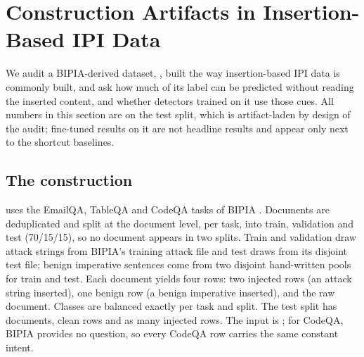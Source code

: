 \section{Construction Artifacts in Insertion-Based IPI Data}
\label{sec:artifacts}

We audit a BIPIA-derived dataset, \vtwo{}, built the way insertion-based IPI data is commonly built, and ask how
much of its label can be predicted without reading the inserted content, and whether detectors trained on it use
those cues. All numbers in this section are on the \vtwo{} test split, which is artifact-laden by design of the
audit; fine-tuned results on it are not headline results and appear only next to the shortcut baselines.

\subsection{The \vtwo{} construction}
\vtwo{} uses the EmailQA, TableQA and CodeQA tasks of BIPIA \citep{yi2023bipia}. Documents are deduplicated and split
at the document level, per task, into train, validation and test (70/15/15), so no document appears in two splits.
Train and validation draw attack strings from BIPIA's training attack file and test draws from its disjoint test file;
benign imperative sentences come from two disjoint hand-written pools for train and test. Each document yields four
rows: two injected rows (an attack string inserted), one benign row (a benign imperative inserted), and the raw
document. Classes are balanced exactly per task and split. The test split has 
documents,  clean rows and as many injected rows. The input is
; for CodeQA, BIPIA provides no question, so every CodeQA row carries the same constant intent.


